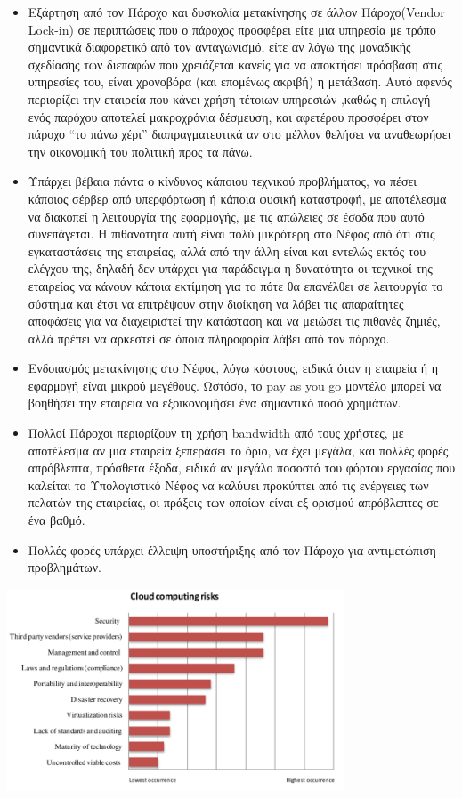 \documentclass{article}
\begin{document}
\begin{itemize}
\item	Εξάρτηση από τον Πάροχο και δυσκολία μετακίνησης σε άλλον Πάροχο(Vendor Lock-in) σε περιπτώσεις που ο πάροχος προσφέρει είτε μια υπηρεσία με τρόπο σημαντικά διαφορετικό από τον ανταγωνισμό, είτε αν λόγω της μοναδικής σχεδίασης των διεπαφών που χρειάζεται κανείς για να αποκτήσει πρόσβαση στις υπηρεσίες του, είναι χρονοβόρα (και επομένως ακριβή) η μετάβαση. Αυτό αφενός περιορίζει την εταιρεία που κάνει χρήση τέτοιων υπηρεσιών ,καθώς η επιλογή ενός παρόχου αποτελεί μακροχρόνια δέσμευση, και αφετέρου προσφέρει στον πάροχο “το πάνω χέρι” διαπραγματευτικά αν στο μέλλον θελήσει να αναθεωρήσει την οικονομική του πολιτική προς τα πάνω. 
\item	Υπάρχει βέβαια πάντα ο κίνδυνος κάποιου τεχνικού προβλήματος, να πέσει κάποιος σέρβερ από υπερφόρτωση ή κάποια φυσική καταστροφή, με αποτέλεσμα να διακοπεί η λειτουργία της εφαρμογής, με τις απώλειες σε έσοδα που αυτό συνεπάγεται. Η πιθανότητα αυτή είναι πολύ μικρότερη στο Νέφος από ότι στις εγκαταστάσεις της εταιρείας, αλλά από την άλλη είναι και εντελώς εκτός του ελέγχου της, δηλαδή δεν υπάρχει για παράδειγμα η δυνατότητα οι τεχνικοί της εταιρείας να κάνουν κάποια εκτίμηση για το πότε θα επανέλθει σε λειτουργία το σύστημα και έτσι να επιτρέψουν στην διοίκηση να λάβει τις απαραίτητες αποφάσεις για να διαχειριστεί την κατάσταση και να μειώσει τις πιθανές ζημιές, αλλά πρέπει να αρκεστεί σε όποια πληροφορία λάβει από τον πάροχο.
\item	Ενδοιασμός μετακίνησης στο Νέφος, λόγω κόστους, ειδικά όταν η εταιρεία ή η εφαρμογή είναι μικρού μεγέθους. Ωστόσο, το pay as you go μοντέλο μπορεί να βοηθήσει την εταιρεία να εξοικονομήσει ένα σημαντικό ποσό χρημάτων.
\item	Πολλοί Πάροχοι περιορίζουν τη χρήση bandwidth από τους χρήστες, με αποτέλεσμα αν μια εταιρεία ξεπεράσει το όριο, να έχει μεγάλα, και πολλές φορές απρόβλεπτα, πρόσθετα έξοδα, ειδικά αν μεγάλο ποσοστό του φόρτου εργασίας που καλείται το Υπολογιστικό Νέφος να καλύψει προκύπτει από τις ενέργειες των πελατών της εταιρείας, οι πράξεις των οποίων είναι εξ ορισμού απρόβλεπτες σε ένα βαθμό.
\item	Πολλές φορές υπάρχει έλλειψη υποστήριξης από τον Πάροχο για αντιμετώπιση προβλημάτων.
\end{itemize}


\includegraphics[width=100mm]{images/risks.png}
\end{document}
